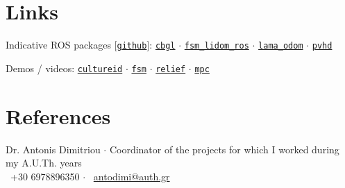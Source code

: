 \documentclass[a4paper,10pt,twoside]{article}
\begin{document}
\section{Links}

Indicative ROS packages [\href{https://github.com/li9i}{\texttt{github}}]:
\href{https://github.com/li9i/cbgl}{\texttt{cbgl}} $\cdot$
\href{https://github.com/li9i/fsm\_lidom\_ros}{\texttt{fsm\_lidom\_ros}} $\cdot$
\href{https://github.com/li9i/lama\_odom}{\texttt{lama\_odom}} $\cdot$
\href{https://github.com/li9i/pandora\_vision\_2014/tree/hydro-devel/pandora\_vision\_hole\_detector}{\texttt{pvhd}}

Demos / videos: \href{https://cultureid.web.auth.gr/?page\_id=200&lang=en}{\texttt{cultureid}} $\cdot$ \href{https://www.youtube.com/watch?v=hB4qsHCEXGI}{\texttt{fsm}} $\cdot$ \href{https://relief.web.auth.gr/}{\texttt{relief}} $\cdot$ \href{https://www.youtube.com/watch?v=937OZez1iN8}{\texttt{mpc}}
\\

\section{References}
Dr. Antonis Dimitriou $\cdot$ Coordinator of the projects for which I worked during my A.U.Th. years \\
\faPhone \ +30 6978896350 $\cdot$ \faEnvelopeO \ \href{mailto:antodimi@auth.gr}{antodimi@auth.gr} \\
\end{document}
